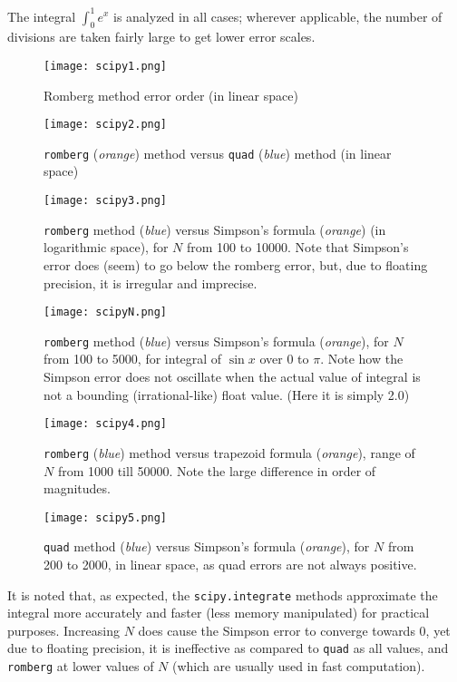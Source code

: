\documentclass{report}
\begin{document}
 The integral $\int_{0}^{1} e^x$ is analyzed in all cases; wherever applicable, the number of divisions are taken fairly large to get lower error scales.
\begin{figure}[H]
	\centering
	\texttt{[image: scipy1.png]}
	\label{scipy1}
	\caption{Romberg method error order (in linear space)}
\end{figure}
\begin{figure}[H]
	\centering
	\texttt{[image: scipy2.png]}
	\label{scipy2}
	\caption{\texttt{romberg} (\emph{orange}) method versus \texttt{quad} (\emph{blue}) method (in linear space)}
\end{figure}
\begin{figure}[H]
	\centering
	\texttt{[image: scipy3.png]}
	\label{scipy3}
	\caption{\texttt{romberg} method (\emph{blue}) versus Simpson's formula (\emph{orange}) (in logarithmic space), for $N$ from 100 to 10000. Note that Simpson's error does (seem) to go below the romberg error, but, due to floating precision, it is irregular and imprecise.}
\end{figure}
\begin{figure}[H]
	\centering
	\texttt{[image: scipyN.png]}
	\label{scipy3.5}
	\caption{\texttt{romberg} method (\emph{blue}) versus Simpson's formula (\emph{orange}), for $N$ from 100 to 5000, for integral of $\sin x$ over 0 to $\pi$. Note how the Simpson error does not oscillate when the actual value of integral is not a bounding (irrational-like) float value. (Here it is simply 2.0)}
\end{figure}
\begin{figure}[H]
	\centering
	\texttt{[image: scipy4.png]}
	\label{scipy4}
	\caption{\texttt{romberg} (\emph{blue}) method versus trapezoid formula (\emph{orange}), range of $N$ from 1000 till 50000. Note the large difference in order of magnitudes.}
\end{figure}
\begin{figure}[H]
	\centering
	\texttt{[image: scipy5.png]}
	\label{scipy5}
	\caption{\texttt{quad} method (\emph{blue}) versus Simpson's formula (\emph{orange}), for $N$ from 200 to 2000, in linear space, as quad errors are not always positive.}
\end{figure}
It is noted that, as expected, the \texttt{scipy.integrate} methods approximate the integral more accurately and faster (less memory manipulated) for practical purposes. Increasing $N$ does cause the Simpson error to converge towards 0, yet due to floating precision, it is ineffective as compared to \texttt{quad} as all values, and \texttt{romberg} at lower values of $N$ (which are usually used in fast computation).
\end{document}
